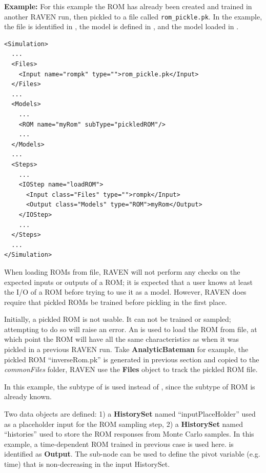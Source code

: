 \textbf{Example:}
For this example the ROM has already been created and trained in another RAVEN run, then pickled to a file
called \texttt{rom\_pickle.pk}.  In the example, the file is identified in , the model is
defined in , and the model loaded in .
{\footnotesize
\begin{lstlisting}[style=XML,morekeywords={name,subType}]
<Simulation>
  ...
  <Files>
    <Input name="rompk" type="">rom_pickle.pk</Input>
  </Files>
  ...
  <Models>
    ...
    <ROM name="myRom" subType="pickledROM"/>
    ...
  </Models>
  ...
  <Steps>
    ...
    <IOStep name="loadROM">
      <Input class="Files" type="">rompk</Input>
      <Output class="Models" type="ROM">myRom</Output>
    </IOStep>
    ...
  </Steps>
  ...
</Simulation>
\end{lstlisting}
}

\nb When loading ROMs from file, RAVEN will not perform any checks on the expected inputs or outputs of a ROM;
it is expected that a user knows at least the I/O of a ROM before trying to use it as a model. However, RAVEN
does require that pickled ROMs be trained before pickling in the first place.

Initially, a pickled ROM is not usable. It can not be trained or sampled; attempting to do so will raise an error.
An  is used to load the ROM from file, at which point the ROM will have all the same characteristics
as when it was pickled in a previous RAVEN run. Take \textbf{AnalyticBateman} for example, the pickled ROM
``inverseRom.pk'' is generated in previous section and copied to the \textit{commonFiles} folder, RAVEN use the
\textbf{Files} object to track the pickled ROM file.

In this example, the subtype  of  is used instead of ,
since the subtype of ROM is already known.

Two data objects are defined: 1) a \textbf{HistorySet} named ``inputPlaceHolder'' used as a placeholder input for
the ROM sampling step, 2) a \textbf{HistorySet} named ``histories'' used to store the ROM responses from Monte
Carlo samples. 
\nb In this example, a time-dependent ROM trained in previous case is used here.  is identified as
\textbf{Output}. The sub-node  can be used to define the pivot variable (e.g. time) that
is non-decreasing in the input HistorySet.

